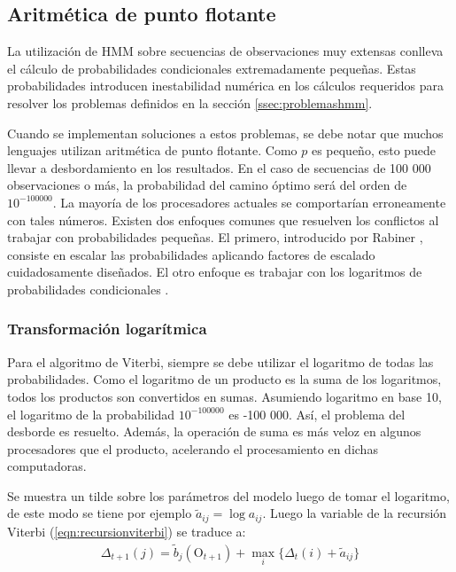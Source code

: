 \subsection{Aritmética de punto flotante}

La utilización de HMM sobre secuencias de observaciones muy extensas conlleva el cálculo de probabilidades condicionales extremadamente pequeñas. Estas probabilidades introducen inestabilidad numérica en los cálculos requeridos para resolver los problemas definidos en la sección \ref{ssec:problemashmm}.

Cuando se implementan soluciones a estos problemas, se debe notar que muchos lenguajes utilizan aritmética de punto flotante. Como $p$ es pequeño, esto puede llevar a desbordamiento en los resultados. En el caso de secuencias de 100 000 observaciones o más, la probabilidad del camino óptimo será del orden de $10^{-100 000}$. La mayoría de los procesadores actuales se comportarían erroneamente con tales números.
Existen dos enfoques comunes que resuelven los conflictos al trabajar con probabilidades pequeñas. El primero, introducido por Rabiner \cite{rabiner1989tutorial}, consiste en escalar las probabilidades aplicando factores de escalado cuidadosamente diseñados. El otro enfoque es trabajar con los logaritmos de  probabilidades condicionales \cite{durbin1998biological}\cite{mann2006numerically}.

\subsubsection{Transformación logarítmica}

Para el algoritmo de Viterbi, siempre se debe utilizar el logaritmo de todas las probabilidades. Como el logaritmo de un producto es la suma de los logaritmos, todos los productos son convertidos en sumas. Asumiendo logaritmo en base 10, el logaritmo de la probabilidad $10^{-100 000}$ es -100 000. Así, el problema del desborde es resuelto. Además, la operación de suma es más veloz en algunos procesadores que el producto, acelerando el procesamiento en dichas computadoras.

Se muestra un tilde sobre los parámetros del modelo luego de tomar el logaritmo, de este modo se tiene por ejemplo $\tilde{a}_{ij} = \log a_{ij}$. Luego la variable de la recursión Viterbi (\ref{eqn:recursionviterbi}) se traduce a:
\begin{align}
    \Delta_{t+1}(j)=\tilde{b}_j(\mathrm{O}_{t+1})+\max_i\{\Delta_t(i)+\tilde{a}_{ij}\} 
\end{align}

